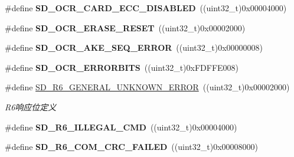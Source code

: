 \begin{DoxyCompactItemize}
\item 
\#define {\bfseries S\+D\+\_\+\+O\+C\+R\+\_\+\+C\+A\+R\+D\+\_\+\+E\+C\+C\+\_\+\+D\+I\+S\+A\+B\+L\+ED}~((uint32\+\_\+t)0x00004000)\hypertarget{group__sd__card__private_ga4e3e8df5237733fa61ced5304d6e25b8}{}\label{group__sd__card__private_ga4e3e8df5237733fa61ced5304d6e25b8}

\item 
\#define {\bfseries S\+D\+\_\+\+O\+C\+R\+\_\+\+E\+R\+A\+S\+E\+\_\+\+R\+E\+S\+ET}~((uint32\+\_\+t)0x00002000)\hypertarget{group__sd__card__private_ga67cbe1781e4db67d3b2fe422ba63de09}{}\label{group__sd__card__private_ga67cbe1781e4db67d3b2fe422ba63de09}

\item 
\#define {\bfseries S\+D\+\_\+\+O\+C\+R\+\_\+\+A\+K\+E\+\_\+\+S\+E\+Q\+\_\+\+E\+R\+R\+OR}~((uint32\+\_\+t)0x00000008)\hypertarget{group__sd__card__private_ga2b6aa7c64b853586d3eecfd251d7709f}{}\label{group__sd__card__private_ga2b6aa7c64b853586d3eecfd251d7709f}

\item 
\#define {\bfseries S\+D\+\_\+\+O\+C\+R\+\_\+\+E\+R\+R\+O\+R\+B\+I\+TS}~((uint32\+\_\+t)0x\+F\+D\+F\+F\+E008)\hypertarget{group__sd__card__private_gace772bc4b0b2fdf6488e308afe8f29d1}{}\label{group__sd__card__private_gace772bc4b0b2fdf6488e308afe8f29d1}

\item 
\#define \hyperlink{group__sd__card__private_ga77d65e0cdecf792a2928b61cc85ed687}{S\+D\+\_\+\+R6\+\_\+\+G\+E\+N\+E\+R\+A\+L\+\_\+\+U\+N\+K\+N\+O\+W\+N\+\_\+\+E\+R\+R\+OR}~((uint32\+\_\+t)0x00002000)\hypertarget{group__sd__card__private_ga77d65e0cdecf792a2928b61cc85ed687}{}\label{group__sd__card__private_ga77d65e0cdecf792a2928b61cc85ed687}

\begin{DoxyCompactList}\small\item\em R6响应位定义 \end{DoxyCompactList}\item 
\#define {\bfseries S\+D\+\_\+\+R6\+\_\+\+I\+L\+L\+E\+G\+A\+L\+\_\+\+C\+MD}~((uint32\+\_\+t)0x00004000)\hypertarget{group__sd__card__private_ga4f58bfcb28f68b87113fea12b172a247}{}\label{group__sd__card__private_ga4f58bfcb28f68b87113fea12b172a247}

\item 
\#define {\bfseries S\+D\+\_\+\+R6\+\_\+\+C\+O\+M\+\_\+\+C\+R\+C\+\_\+\+F\+A\+I\+L\+ED}~((uint32\+\_\+t)0x00008000)\hypertarget{group__sd__card__private_gad4677c73c4e8e7e1ec2161554cfdfeeb}{}\label{group__sd__card__private_gad4677c73c4e8e7e1ec2161554cfdfeeb}


\end{DoxyCompactItemize}
